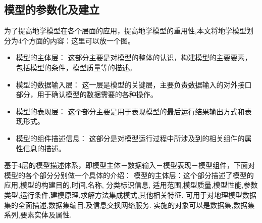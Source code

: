 \documentclass[master]{njnuthesis}
\begin{document}
\subsection{模型的参数化及建立}
为了提高地学模型在各个层面的应用，提高地学模型的重用性,本文将地学模型划分为4个方面的内容：这里可以放一个图。
\begin{itemize}
\item 模型的主体层：
这部分主要是对模型的整体的认识，构建模型的主要要素，包括模型的条件，模型质量等的描述。
\item 模型的数据输入层：
这一层是模型的关键层，主要负责数据输入的对外接口部分，用于确认模型的数据需要的各种操作。
\item 模型的表现层：
这个部分主要是用于表现模型的最后运行结果输出方式和表现形式。
\item 模型的组件描述信息：
这部分是对模型运行过程中所涉及到的相关组件的属性信息的描述。
\end{itemize}

基于4层的模型描述体系，即模型主体－数据输入－模型表现－模型组件，下面对模型的各个部分分别做一个具体的介绍：
模型的主体层：这个部分描述了模型的应用,模型的构建目的,时间,名称, 分类标识信息, 适用范围,模型质量,模型性能,参数类型,运行条件,建模原理,求解方法集成模式,其他相关特征.
可用于对地理模型数据集的全面描述,数据集编目,及信息交换网络服务. 实施的对象可以是数据集,数据集系列,要素实体及属性.
\end{document}
